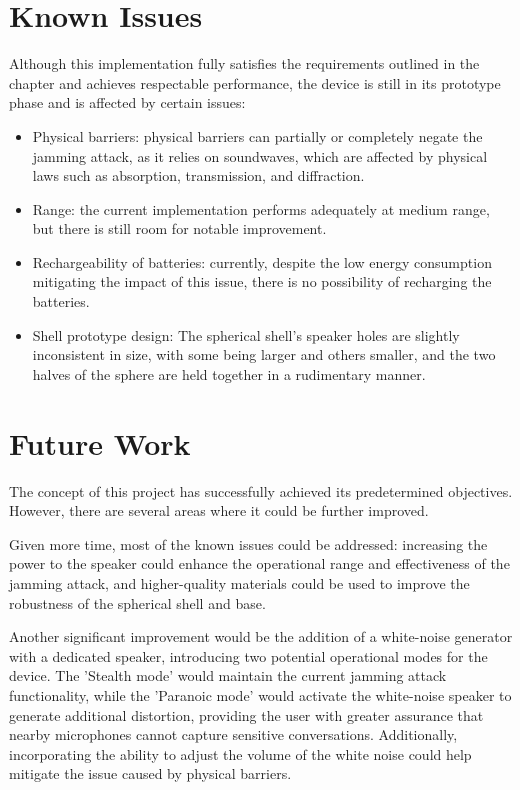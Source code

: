 \section{Known Issues}
Although this implementation fully satisfies the requirements outlined in the  chapter and achieves respectable performance, the device is still in its prototype phase and is affected by certain issues:
\begin{itemize}
    \item Physical barriers: physical barriers can partially or completely negate the jamming attack, as it relies on soundwaves, which are affected by physical laws such as absorption, transmission, and diffraction.
    \item Range: the current implementation performs adequately at medium range, but there is still room for notable improvement.
    \item Rechargeability of batteries: currently, despite the low energy consumption mitigating the impact of this issue, there is no possibility of recharging the batteries.
    \item Shell prototype design: The spherical shell's speaker holes are slightly inconsistent in size, with some being larger and others smaller, and the two halves of the sphere are held together in a rudimentary manner.
\end{itemize}
\section{Future Work}
The concept of this project has successfully achieved its predetermined objectives. 
However, there are several areas where it could be further improved. 

Given more time, most of the known issues could be addressed: increasing the power to the speaker could enhance the operational range and effectiveness of the jamming attack, and higher-quality materials could be used to improve the robustness of the spherical shell and base.

Another significant improvement would be the addition of a white-noise generator with a dedicated speaker, introducing two potential operational modes for the device. 
The 'Stealth mode' would maintain the current jamming attack functionality, while the 'Paranoic mode' would activate the white-noise speaker to generate additional distortion, providing the user with greater assurance that nearby microphones cannot capture sensitive conversations.
Additionally, incorporating the ability to adjust the volume of the white noise could help mitigate the issue caused by physical barriers.